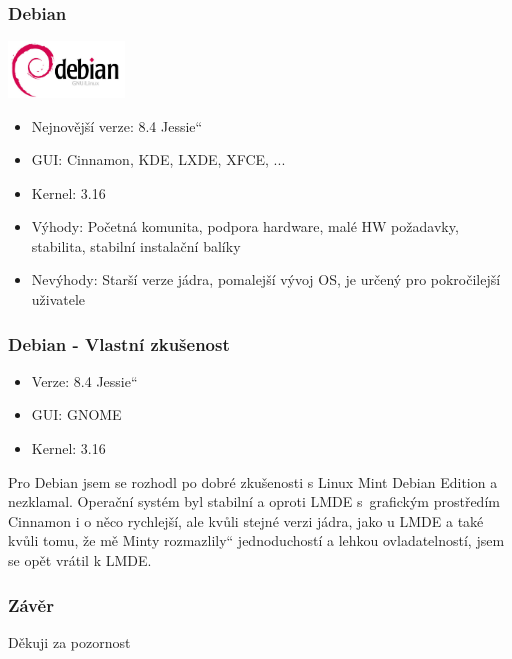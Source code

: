 \documentclass{beamer}
\newcommand{\czuv}[1]{\quotedblbase #1\textquotedblleft}
\begin{document}
  \begin{frame}
    \frametitle{Debian}
    \includegraphics[height=1.5cm]{Debian.jpg}
      \begin{itemize}
	\item Nejnovější verze: 8.4 \czuv{Jessie}
	\item GUI: Cinnamon, KDE, LXDE, XFCE, ...
	\item Kernel: 3.16
	\item Výhody: Početná komunita, podpora hardware, malé HW požadavky, stabilita, stabilní instalační balíky
	\item Nevýhody: Starší verze jádra, pomalejší vývoj OS, je určený pro pokročilejší uživatele
      \end{itemize}
  \end{frame}
  \begin{frame}
    \frametitle{Debian - Vlastní zkušenost}
      \begin{itemize}
	\item Verze: 8.4 \czuv{Jessie}
	\item GUI: GNOME
	\item Kernel: 3.16
      \end{itemize}
      Pro Debian jsem se rozhodl po dobré zkušenosti s Linux Mint Debian Edition a nezklamal.
      Operační systém byl stabilní a oproti LMDE s~grafickým prostředím Cinnamon i o něco rychlejší,
      ale kvůli stejné verzi jádra, jako u LMDE a také kvůli tomu, že mě Minty \czuv{rozmazlily}
      jednoduchostí a lehkou ovladatelností, jsem se opět vrátil k LMDE.
  \end{frame}
  \begin{frame}
    \frametitle{Závěr}
    \begin{center}   
      Děkuji za pozornost
    \end{center}
  \end{frame}
\end{document}
